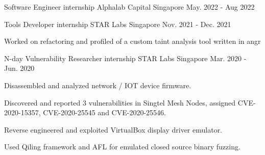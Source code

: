 

\begin{cventries}

  \cventry
    {Software Engineer internship}
    {Alphalab Capital}
    {Singapore}
    {May. 2022 - Aug 2022}
    {
        \begin{cvitems}
        \end{cvitems}
    }

  \cventry
    {Tools Developer internship} %
    {STAR Labs} %
    {Singapore} %
    {Nov. 2021 - Dec. 2021} %
    {
      \begin{cvitems} %
        \item {Worked on refactoring and profiled of a custom taint analysis tool written in angr}
      \end{cvitems}
    }

  \cventry
    {N-day Vulnerability Researcher internship} %
    {STAR Labs} %
    {Singapore} %
    {Mar. 2020 - Jun. 2020} %
    {
      \begin{cvitems} %
        \item {Disassembled and analyzed network / IOT device firmware.}
        \item {Discovered and reported 3 vulnerabilities in Singtel Mesh Nodes, assigned CVE-2020-15357, CVE-2020-25545 and CVE-2020-25546.}
        \item {Reverse engineered and exploited VirtualBox display driver emulator.}
        \item {Used Qiling framework and AFL for emulated closed source binary fuzzing.}
      \end{cvitems}
    }


\end{cventries}
